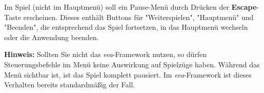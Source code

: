 Im Spiel (nicht im Hauptmenü) soll ein Pause-Menü durch Drücken der \textbf{Escape}-Taste erscheinen. Dieses enthält Buttons für "Weiterspielen", "Hauptmenü" und "Beenden", die entsprechend das Spiel fortsetzen, in das Hauptmenü wechseln oder die Anwendung beenden.

\textbf{Hinweis:} Sollten Sie nicht das \emph{eea}-Framework nutzen, so dürfen Steuerungsbefehle im Menü keine Auswirkung auf Spielzüge haben. Während das Menü sichtbar ist, ist das Spiel komplett pausiert. Im \emph{eea}-Framework ist dieses Verhalten bereits standardmäßig der Fall.
